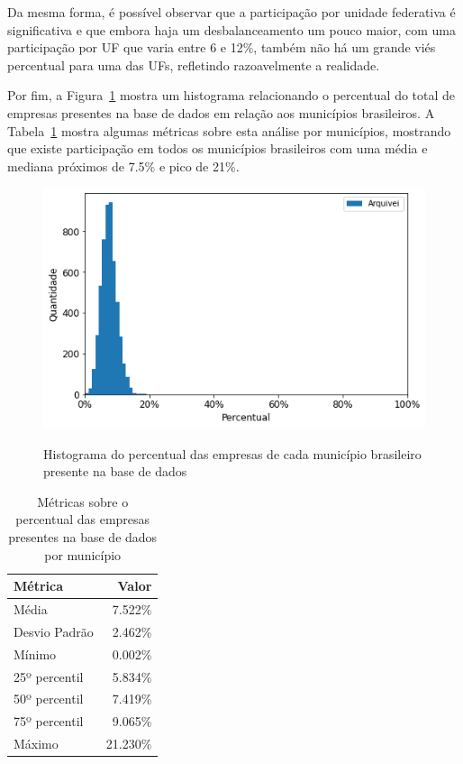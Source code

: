 Da mesma forma, é possível observar que a participação por unidade federativa é significativa e que embora haja um desbalanceamento um pouco maior, com uma participação por UF que varia entre 6 e 12\%, também não há um grande viés percentual para uma das UFs, refletindo razoavelmente a realidade.

Por fim, a Figura~\ref{fig:base-de-dados:descritiva-3.1-presenca-por-mun} mostra um histograma relacionando o percentual do total de empresas presentes na base de dados em relação aos municípios brasileiros. A Tabela~\ref{tab:participacao-por-mun} mostra algumas métricas sobre esta análise por municípios, mostrando que existe participação em todos os municípios brasileiros com uma média e mediana próximos de 7.5\% e pico de 21\%.

\begin{figure}[htb]
    \centering
    \caption{Histograma do percentual das empresas de cada município brasileiro presente na base de dados}
    \includegraphics[scale=0.7]{images/base-de-dados-3.1-presenca-por-mun.png}
    \label{fig:base-de-dados:descritiva-3.1-presenca-por-mun}
    \fdadospesquisa
\end{figure}

\begin{table}[htb]
\centering
\caption{Métricas sobre o percentual das empresas presentes na base de dados por município}
\label{tab:participacao-por-mun}
\begin{tabular}{lr}
\toprule
Métrica & Valor \\
\midrule
Média         &    7.522\% \\
Desvio Padrão &    2.462\% \\
Mínimo        &    0.002\% \\
25º percentil &    5.834\% \\
50º percentil &    7.419\% \\
75º percentil &    9.065\% \\
Máximo        &   21.230\% \\
\bottomrule
\end{tabular}
\fdadospesquisa
\end{table}

